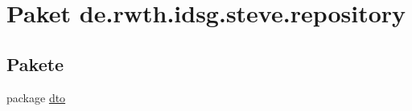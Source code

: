 \hypertarget{namespacede_1_1rwth_1_1idsg_1_1steve_1_1repository}{\section{Paket de.\-rwth.\-idsg.\-steve.\-repository}
\label{namespacede_1_1rwth_1_1idsg_1_1steve_1_1repository}
}
\subsection*{Pakete}
\begin{DoxyCompactItemize}
\item 
package \hyperlink{namespacede_1_1rwth_1_1idsg_1_1steve_1_1repository_1_1dto}{dto}
\end{DoxyCompactItemize}

